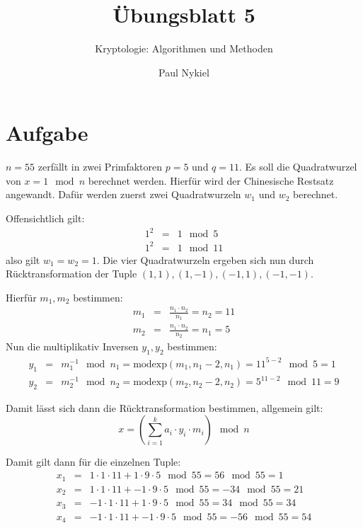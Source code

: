 \documentclass[DIN, pagenumber=false, fontsize=11pt, parskip=half]{scrartcl}
\title{Übungsblatt 5}
\subtitle{Kryptologie: Algorithmen und Methoden}
\author{Paul Nykiel}
\begin{document}
    \maketitle
    \section{Aufgabe}
    $n=55$ zerfällt in zwei Primfaktoren $p=5$ und $q=11$. Es soll die Quadratwurzel
    von $x=1 \mod n$ berechnet werden. Hierfür wird der Chinesische Restsatz angewandt.
    Dafür werden zuerst zwei Quadratwurzeln $w_1$ und $w_2$ berechnet.

    Offensichtlich gilt:
    \begin{eqnarray}
        1^2 &=& 1 \mod 5 \\
        1^2 &=& 1 \mod 11
    \end{eqnarray}
    also gilt $w_1 = w_2 = 1$. Die vier Quadratwurzeln ergeben sich nun durch
    Rücktransformation der Tuple $(1,1), (1,-1), (-1, 1), (-1, -1)$.

    Hierfür $m_1, m_2$ bestimmen:
    \begin{eqnarray}
        m_1 &=& \frac{n_1 \cdot n_2}{n_1} = n_2 = 11\\
        m_2 &=& \frac{n_1 \cdot n_2}{n_2} = n_1 = 5
    \end{eqnarray}
    Nun die multiplikativ Inversen $y_1, y_2$ bestimmen:
    \begin{eqnarray}
        y_1 &=& m_1^{-1} \mod n_1 = \text{modexp}(m_1, n_1 - 2, n_1) = 11^{5-2} \mod 5 = 1\\
        y_2 &=& m_2^{-1} \mod n_2 = \text{modexp}(m_2, n_2 - 2, n_2) = 5^{11-2} \mod 11 = 9
    \end{eqnarray}

    Damit lässt sich dann die Rücktransformation bestimmen, allgemein gilt:
    \begin{equation}
        x = \left( \sum_{i=1}^k a_i \cdot y_i \cdot m_i \right) \mod n
    \end{equation}

    Damit gilt dann für die einzelnen Tuple:
    \begin{eqnarray}
        x_1 &=& 1 \cdot 1 \cdot 11 + 1 \cdot 9 \cdot 5 \mod 55 = 56 \mod 55 = 1 \\
        x_2 &=& 1 \cdot 1 \cdot 11 + -1 \cdot 9 \cdot 5 \mod 55 = -34 \mod 55 = 21 \\
        x_3 &=& -1 \cdot 1 \cdot 11 + 1 \cdot 9 \cdot 5 \mod 55 = 34 \mod 55  = 34\\
        x_4 &=& -1 \cdot 1 \cdot 11 + -1 \cdot 9 \cdot 5 \mod 55 = -56 \mod 55 = 54 \\
    \end{eqnarray}
\end{document}
